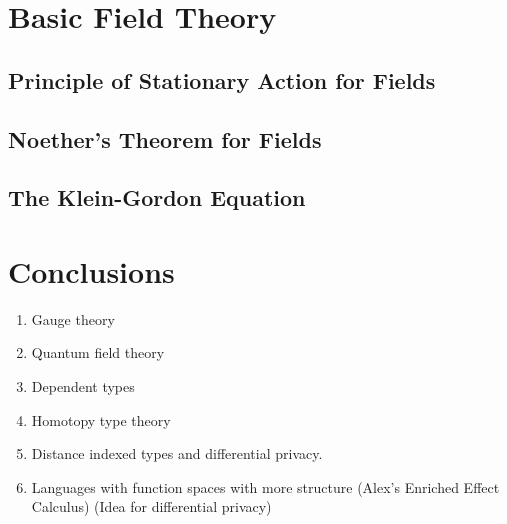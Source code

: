\documentclass[preprint]{sigplanconf}
\theoremstyle{examplestyle}
\begin{document}
\section{Basic Field Theory}

\subsection{Principle of Stationary Action for Fields}

\subsection{Noether's Theorem for Fields}

\subsection{The Klein-Gordon Equation}

\section{Conclusions}

\begin{enumerate}
\item Gauge theory
\item Quantum field theory
\item Dependent types
\item Homotopy type theory
\item Distance indexed types and differential privacy.
\item Languages with function spaces with more structure (Alex's
  Enriched Effect Calculus) (Idea for differential privacy)
\end{enumerate}
\end{document}
